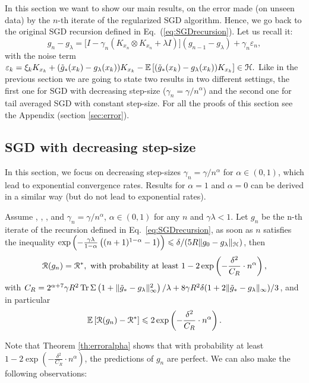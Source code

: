 

In this section we want to show our main results, on the error made (on unseen data) by the $n$-th iterate of the regularized SGD algorithm. Hence, we go back to the original SGD recursion defined in Eq.~(\ref{eq:SGDrecursion}). Let us recall it:
\begin{equation*}
    {g}_n - g_\lambda =  \big[
I - \gamma_n   (  K_{x_n} \otimes K_{x_n} + \lambda I ) \big]
  ( {g}_{n-1} - g_\lambda )   + \gamma_n \varepsilon_n,
\end{equation*}
%
with the noise term $\varepsilon_k  =   \xi_k K_{x_k}   +   (\tilde{g}_*(x_k)- g_\lambda(x_k)) K_{x_k} - {\mathbb E} \left[ (\tilde{g}_*(x_k)- g_\lambda(x_k)) K_{x_k} \right] \in {\mathcal H}.$ Like in the previous section we are going to state two results in two different settings, the first one for SGD with decreasing step-size ($\gamma_n = \gamma / n^\alpha$) and the second one for tail averaged SGD with constant step-size. For all the proofs of this section see the Appendix (section \ref{sec:error}).

\subsection{SGD with decreasing step-size}

In this section, we focus on decreasing step-sizes $\gamma_n = \gamma/n^\alpha$ for $\alpha \in (0,1)$, which lead to exponential convergence rates. Results for $\alpha=1$ and $\alpha=0$ can be derived in a similar way (but do not lead to exponential rates).
\clearpage
\begin{theorem}
\label{th:erroralpha}
Assume , , ,  and $\gamma_n = \gamma/n^\alpha$, $\alpha \in (0,1)$ for any $n$ and $\gamma\lambda < 1$. Let $g_n$ be the n-th iterate of the recursion defined in Eq.~\eqref{eq:SGDrecursion}, as soon as $n$ satisfies the inequality $\exp\left(  -\frac{\gamma\lambda}{1-\alpha}\left( (n+1)^{1-\alpha} -1  \right)   \right) \leqslant \delta / (5R\|g_0- g_\lambda\|_{\mathcal H})$, then 
\begin{align*}
{\cal R}(g_n) = {\cal R}^*, \mbox{ with probability at least }1-2\exp\left( -\frac{ \delta^2}{C_R}\cdot n^{\alpha}\right),
\end{align*}
with $C_R = 2 ^{\alpha + 7}\gamma R^2 \operatorname{Tr} \Sigma  \left(1+\|\tilde{g}_*- g_\lambda\|^2_\infty\right)/\lambda+8\gamma R^2 \delta( 1 + 2 \| \tilde{g}_* - g_\lambda\|_\infty )/3 $,  and in particular 
$$ \mathbb{E}\left[{{\cal R}(g_n) - {\cal R}^*}\right] \leqslant 2\exp\left( -\frac{ \delta^2}{C_R}\cdot n^{\alpha}\right).$$
\end{theorem}
%
Note that Theorem \ref{th:erroralpha} shows that with probability at least $1-2\exp\left( -\frac{ \delta^2}{C_R}\cdot n^{\alpha}\right)$, the predictions of $g_n$ are perfect. We can also make the following observations:
\vspace{-0.1cm}
\BIT
\itemsep-3pt

